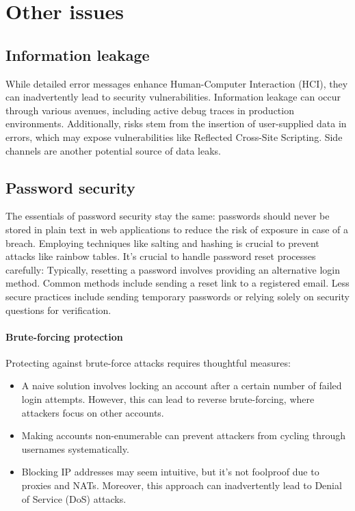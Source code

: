 \section{Other issues}

\subsection{Information leakage}
While detailed error messages enhance Human-Computer Interaction (HCI), they can inadvertently lead to security vulnerabilities. 
Information leakage can occur through various avenues, including active debug traces in production environments. 
Additionally, risks stem from the insertion of user-supplied data in errors, which may expose vulnerabilities like Reflected Cross-Site Scripting. 
Side channels are another potential source of data leaks.

\subsection{Password security}
The essentials of password security stay the same: passwords should never be stored in plain text in web applications to reduce the risk of exposure in case of a breach. 
Employing techniques like salting and hashing is crucial to prevent attacks like rainbow tables. 
It's crucial to handle password reset processes carefully: Typically, resetting a password involves providing an alternative login method. 
Common methods include sending a reset link to a registered email. 
Less secure practices include sending temporary passwords or relying solely on security questions for verification.

\paragraph*{Brute-forcing protection}
Protecting against brute-force attacks requires thoughtful measures:
\begin{itemize}
    \item A naive solution involves locking an account after a certain number of failed login attempts. 
        However, this can lead to reverse brute-forcing, where attackers focus on other accounts.
    \item Making accounts non-enumerable can prevent attackers from cycling through usernames systematically.
    \item  Blocking IP addresses may seem intuitive, but it's not foolproof due to proxies and NATs. 
        Moreover, this approach can inadvertently lead to Denial of Service (DoS) attacks.
\end{itemize}